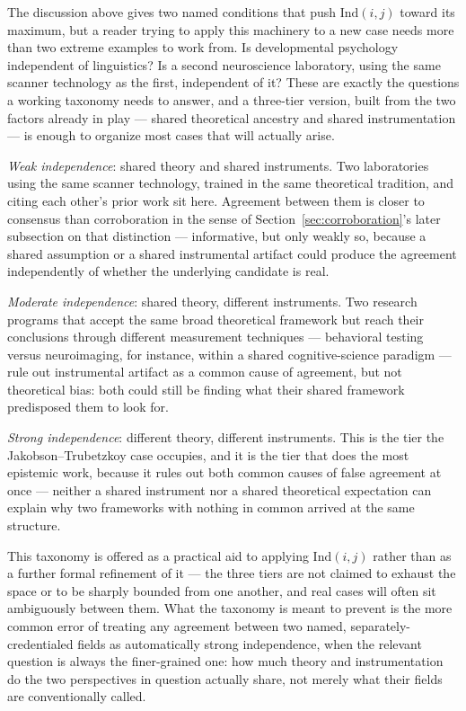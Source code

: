 The discussion above gives two named conditions that push $\mathrm{Ind}(i,j)$ toward its maximum, but a reader trying to apply this machinery to a new case needs more than two extreme examples to work from. Is developmental psychology independent of linguistics? Is a second neuroscience laboratory, using the same scanner technology as the first, independent of it? These are exactly the questions a working taxonomy needs to answer, and a three-tier version, built from the two factors already in play --- shared theoretical ancestry and shared instrumentation --- is enough to organize most cases that will actually arise.

\emph{Weak independence}: shared theory and shared instruments. Two laboratories using the same scanner technology, trained in the same theoretical tradition, and citing each other's prior work sit here. Agreement between them is closer to consensus than corroboration in the sense of Section~\ref{sec:corroboration}'s later subsection on that distinction --- informative, but only weakly so, because a shared assumption or a shared instrumental artifact could produce the agreement independently of whether the underlying candidate is real.

\emph{Moderate independence}: shared theory, different instruments. Two research programs that accept the same broad theoretical framework but reach their conclusions through different measurement techniques --- behavioral testing versus neuroimaging, for instance, within a shared cognitive-science paradigm --- rule out instrumental artifact as a common cause of agreement, but not theoretical bias: both could still be finding what their shared framework predisposed them to look for.

\emph{Strong independence}: different theory, different instruments. This is the tier the Jakobson--Trubetzkoy case occupies, and it is the tier that does the most epistemic work, because it rules out both common causes of false agreement at once --- neither a shared instrument nor a shared theoretical expectation can explain why two frameworks with nothing in common arrived at the same structure.

This taxonomy is offered as a practical aid to applying $\mathrm{Ind}(i,j)$ rather than as a further formal refinement of it --- the three tiers are not claimed to exhaust the space or to be sharply bounded from one another, and real cases will often sit ambiguously between them. What the taxonomy is meant to prevent is the more common error of treating any agreement between two named, separately-credentialed fields as automatically strong independence, when the relevant question is always the finer-grained one: how much theory and instrumentation do the two perspectives in question actually share, not merely what their fields are conventionally called.

